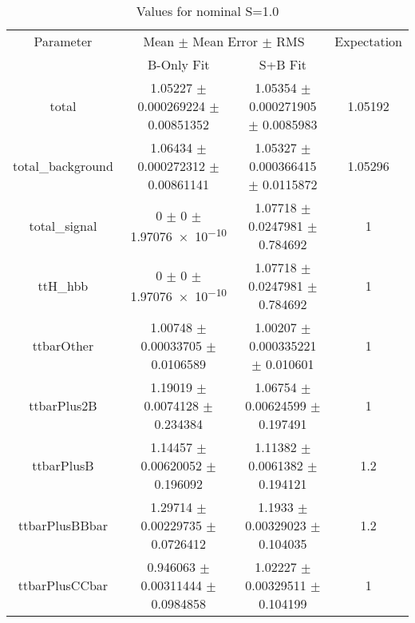 \begin{table}
\centering
\caption{Values for nominal S=1.0}
\begin{tabular}{cccc}
\toprule
Parameter & \multicolumn{2}{c}{Mean $\pm$ Mean Error $\pm$ RMS} & Expectation\\
 & B-Only Fit & S+B Fit & \\
\midrule
total & \num{1.05227} $\pm$ \num{0.000269224} $\pm$ \num{0.00851352} & \num{1.05354} $\pm$ \num{0.000271905} $\pm$ \num{0.0085983} & \num{1.05192}\\
total\_background & \num{1.06434} $\pm$ \num{0.000272312} $\pm$ \num{0.00861141} & \num{1.05327} $\pm$ \num{0.000366415} $\pm$ \num{0.0115872} & \num{1.05296}\\
total\_signal & \num{0} $\pm$ \num{0} $\pm$ \num{1.97076e-10} & \num{1.07718} $\pm$ \num{0.0247981} $\pm$ \num{0.784692} & \num{1}\\
ttH\_hbb & \num{0} $\pm$ \num{0} $\pm$ \num{1.97076e-10} & \num{1.07718} $\pm$ \num{0.0247981} $\pm$ \num{0.784692} & \num{1}\\
ttbarOther & \num{1.00748} $\pm$ \num{0.00033705} $\pm$ \num{0.0106589} & \num{1.00207} $\pm$ \num{0.000335221} $\pm$ \num{0.010601} & \num{1}\\
ttbarPlus2B & \num{1.19019} $\pm$ \num{0.0074128} $\pm$ \num{0.234384} & \num{1.06754} $\pm$ \num{0.00624599} $\pm$ \num{0.197491} & \num{1}\\
ttbarPlusB & \num{1.14457} $\pm$ \num{0.00620052} $\pm$ \num{0.196092} & \num{1.11382} $\pm$ \num{0.0061382} $\pm$ \num{0.194121} & \num{1.2}\\
ttbarPlusBBbar & \num{1.29714} $\pm$ \num{0.00229735} $\pm$ \num{0.0726412} & \num{1.1933} $\pm$ \num{0.00329023} $\pm$ \num{0.104035} & \num{1.2}\\
ttbarPlusCCbar & \num{0.946063} $\pm$ \num{0.00311444} $\pm$ \num{0.0984858} & \num{1.02227} $\pm$ \num{0.00329511} $\pm$ \num{0.104199} & \num{1}\\
\bottomrule
\end{tabular}
\end{table}